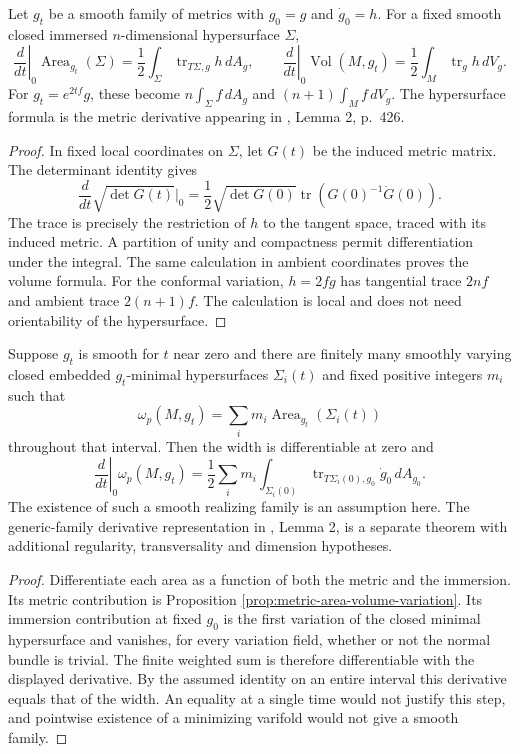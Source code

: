 \begin{proposition}\label{prop:metric-area-volume-variation}
Let $g_t$ be a smooth family of metrics with $g_0=g$ and $\dot g_0=h$. For a fixed smooth closed immersed $n$-dimensional hypersurface $\Sigma$,
\[
 \left.\frac d{dt}\right|_0\operatorname{Area}_{g_t}(\Sigma)
 =\frac12\int_\Sigma\operatorname{tr}_{T\Sigma,g}h\,dA_g,
 \qquad
 \left.\frac d{dt}\right|_0\operatorname{Vol}(M,g_t)
 =\frac12\int_M\operatorname{tr}_g h\,dV_g.
\]
For $g_t=e^{2tf}g$, these become $n\int_\Sigma f\,dA_g$ and $(n+1)\int_M f\,dV_g$. The hypersurface formula is the metric derivative appearing in \cite{MNS19}, Lemma 2, p.~426.
\end{proposition}
\begin{proof}
In fixed local coordinates on $\Sigma$, let $G(t)$ be the induced metric matrix. The determinant identity gives
\[
 \frac d{dt}\sqrt{\det G(t)}\Big|_0
 =\frac12\sqrt{\det G(0)}\operatorname{tr}(G(0)^{-1}\dot G(0)).
\]
The trace is precisely the restriction of $h$ to the tangent space, traced with its induced metric. A partition of unity and compactness permit differentiation under the integral. The same calculation in ambient coordinates proves the volume formula. For the conformal variation, $h=2fg$ has tangential trace $2nf$ and ambient trace $2(n+1)f$. The calculation is local and does not need orientability of the hypersurface.
\end{proof}

\begin{proposition}\label{prop:smooth-width-realizer-derivative}
Suppose $g_t$ is smooth for $t$ near zero and there are finitely many smoothly varying closed embedded $g_t$-minimal hypersurfaces $\Sigma_i(t)$ and fixed positive integers $m_i$ such that
\[
 \omega_p(M,g_t)=\sum_i m_i\operatorname{Area}_{g_t}(\Sigma_i(t))
\]
throughout that interval. Then the width is differentiable at zero and
\[
 \left.\frac d{dt}\right|_0\omega_p(M,g_t)
 =\frac12\sum_i m_i\int_{\Sigma_i(0)}\operatorname{tr}_{T\Sigma_i(0),g_0}\dot g_0\,dA_{g_0}.
\]
The existence of such a smooth realizing family is an assumption here. The generic-family derivative representation in \cite{MNS19}, Lemma 2, is a separate theorem with additional regularity, transversality and dimension hypotheses.
\end{proposition}
\begin{proof}
Differentiate each area as a function of both the metric and the immersion. Its metric contribution is Proposition \ref{prop:metric-area-volume-variation}. Its immersion contribution at fixed $g_0$ is the first variation of the closed minimal hypersurface and vanishes, for every variation field, whether or not the normal bundle is trivial. The finite weighted sum is therefore differentiable with the displayed derivative. By the assumed identity on an entire interval this derivative equals that of the width. An equality at a single time would not justify this step, and pointwise existence of a minimizing varifold would not give a smooth family.
\end{proof}

